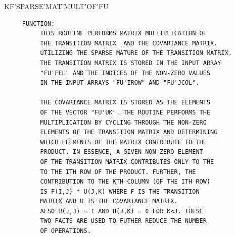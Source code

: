 \begin{frame}
KF'SPARSE'MAT'MULT'OF'FU
\begin{verbatim}
     FUNCTION:
          THIS ROUTINE PERFORMS MATRIX MULTIPLICATION OF
          THE TRANSITION MATRIX  AND THE COVARIANCE MATRIX.
          UTILIZING THE SPARSE MATURE OF THE TRANSITION MATRIX.
          THE TRANSITION MATRIX IS STORED IN THE INPUT ARRAY
          "FU'FEL" AND THE INDICES OF THE NON-ZERO VALUES
          IN THE INPUT ARRAYS "FU'IROW" AND "FU'JCOL".

          THE COVARIANCE MATRIX IS STORED AS THE ELEMENTS
          OF THE VECTOR "FU'UK". THE ROUTINE PERFORMS THE
          MULTIPLICATION BY CYCLING THROUGH THE NON-ZERO
          ELEMENTS OF THE TRANSITION MATRIX AND DETERMINING
          WHICH ELEMENTS OF THE MATRIX CONTRIBUTE TO THE
          PRODUCT. IN ESSENCE, A GIVEN NON-ZERO ELEMENT
          OF THE TRANSITION MATRIX CONTRIBUTES ONLY TO THE
          TO THE ITH ROW OF THE PRODUCT. FURTHER, THE
          CONTRIBUTION TO THE KTH COLUMN (OF THE ITH ROW)
          IS F(I,J) * U(J,K) WHERE F IS THE TRANSITION
          MATRIX AND U IS THE COVARIANCE MATRIX.
          ALSO U(J,J) = 1 AND U(J,K) = 0 FOR K<J. THESE
          TWO FACTS ARE USED TO FUTHER REDUCE THE NUMBER
          OF OPERATIONS.

\end{verbatim}
\end{frame}
